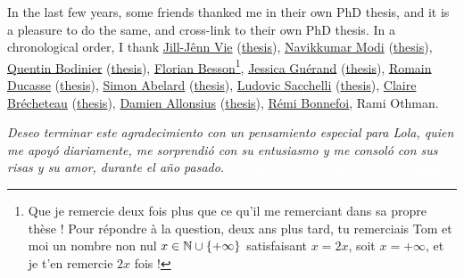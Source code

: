 \begin{acknowledgements}
In the last few years, some friends thanked me in their own PhD thesis, and it is a pleasure to do the same, and cross-link to their own PhD thesis.
In a chronological order, I thank
\href{http://jill-jenn.net/}{Jill-Jênn Vie} (\href{https://github.com/jilljenn/phd}{thesis}), \href{https://navikkumarmodi.wordpress.com/}{Navikkumar Modi} (\href{https://tel.archives-ouvertes.fr/tel-01668536/document}{thesis}), \href{https://quentinbodinier.wordpress.com/}{Quentin Bodinier} (\href{https://tel.archives-ouvertes.fr/tel-01731022/document}{thesis}), \href{https://paris-sorbonne.academia.edu/FBesson}{Florian Besson}\footnote{Que je remercie deux fois plus que ce qu'il me remerciant dans sa propre thèse ! Pour répondre à la question, deux ans plus tard, tu remerciais Tom et moi un nombre non nul $x\in\mathbb{N}\cup\{+\infty\}$ satisfaisant $x=2x$, soit $x=+\infty$, et je t'en remercie $2x$ fois !}, \href{https://sites.google.com/view/guerand}{Jessica Guérand} (\href{https://www.theses.fr/s175725}{the}\href{https://www.theses.fr/s175725}{sis}), \href{https://sites.google.com/view/ducasse/}{Romain Ducasse} (\href{https://drive.google.com/open?id=1u2oxRRimcO0jQfuYwSVwgKfcHU5DdoPK}{thesis}), \href{https://members.loria.fr/SAbelard/}{Simon Abelard} (\href{https://members.loria.fr/SAbelard/theseabelard.pdf}{thesis}), \href{http://www.cmap.polytechnique.fr/~sacchelli/}{Ludovic Sacchelli} (\href{https://tel.archives-ouvertes.fr/tel-01893068/document}{thesis}), \href{http://pages.saclay.inria.fr/claire.brecheteau/}{Claire Brécheteau} (\href{https://hal.archives-ouvertes.fr/tel-01897787/document}{thesis}), \href{http://www.i2m.univ-amu.fr/perso/damien.allonsius/}{Damien Allonsius} (\href{http://www.i2m.univ-amu.fr/perso/damien.allonsius/documents/recherche/these/Main.pdf}{thesis}), \href{https://remibonnefoi.wordpress.com/}{Rémi Bonnefoi}, Rami Othman.

%
%
\emph{Deseo terminar este agradecimiento con un pensamiento especial para Lola, quien me apoyó diariamente, me sorprendió con su entusiasmo y me consoló con sus risas y su amor, durante el año pasado.}
\textcolor{white}{Te quiero, Lola, ¿quieres vivir conmigo?}

\end{acknowledgements}
